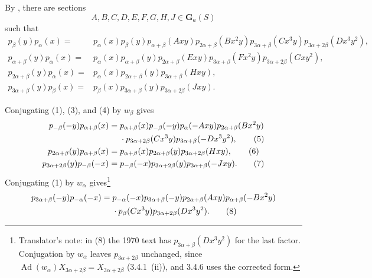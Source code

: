 By , there are sections
\[
  A,B,C,D,E,F,G,H,J\in\mathbf G_a(S)
\]
such that
\begin{align}
 p_\beta(y)p_\alpha(x)
  ={}&p_\alpha(x)p_\beta(y)p_{\alpha+\beta}(Axy)
     p_{2\alpha+\beta}(Bx^2y)p_{3\alpha+\beta}(Cx^3y)
     p_{3\alpha+2\beta}(Dx^3y^2), \tag{1}\label{sga3:XXIII:3.4:eq1}\\
 p_{\alpha+\beta}(y)p_\alpha(x)
  ={}&p_\alpha(x)p_{\alpha+\beta}(y)p_{2\alpha+\beta}(Exy)
     p_{3\alpha+\beta}(Fx^2y)p_{3\alpha+2\beta}(Gxy^2),
     \tag{2}\label{sga3:XXIII:3.4:eq2}\\
 p_{2\alpha+\beta}(y)p_\alpha(x)
  ={}&p_\alpha(x)p_{2\alpha+\beta}(y)p_{3\alpha+\beta}(Hxy),
     \tag{3}\label{sga3:XXIII:3.4:eq3}\\
 p_{3\alpha+\beta}(y)p_\beta(x)
  ={}&p_\beta(x)p_{3\alpha+\beta}(y)p_{3\alpha+2\beta}(Jxy).
     \tag{4}\label{sga3:XXIII:3.4:eq4}
\end{align}

Conjugating (1), (3), and (4) by \(w_\beta\) gives
\begin{align}
 p_{-\beta}(-y)p_{\alpha+\beta}(x)
  ={}&p_{\alpha+\beta}(x)p_{-\beta}(-y)p_\alpha(-Axy)
     p_{2\alpha+\beta}(Bx^2y)\notag\\
    &{}\cdot p_{3\alpha+2\beta}(Cx^3y)
     p_{3\alpha+\beta}(-Dx^3y^2), \tag{5}\label{sga3:XXIII:3.4:eq5}\\
 p_{2\alpha+\beta}(y)p_{\alpha+\beta}(x)
  ={}&p_{\alpha+\beta}(x)p_{2\alpha+\beta}(y)
     p_{3\alpha+2\beta}(Hxy), \tag{6}\label{sga3:XXIII:3.4:eq6}\\
 p_{3\alpha+2\beta}(y)p_{-\beta}(-x)
  ={}&p_{-\beta}(-x)p_{3\alpha+2\beta}(y)
     p_{3\alpha+\beta}(-Jxy). \tag{7}\label{sga3:XXIII:3.4:eq7}
\end{align}
Conjugating (1) by \(w_\alpha\) gives\footnote{Translator's note: in (8) the 1970 text has
\(p_{3\alpha+\beta}(Dx^3y^2)\) for the last factor. Conjugation by \(w_\alpha\) leaves
\(p_{3\alpha+2\beta}\) unchanged, since
\(\operatorname{Ad}(w_\alpha)X_{3\alpha+2\beta}=X_{3\alpha+2\beta}\) (3.4.1~(ii)), and 3.4.6
uses the corrected form.}
\begin{align}
 p_{3\alpha+\beta}(-y)p_{-\alpha}(-x)
  ={}&p_{-\alpha}(-x)p_{3\alpha+\beta}(-y)
     p_{2\alpha+\beta}(Axy)p_{\alpha+\beta}(-Bx^2y)\notag\\
    &{}\cdot p_\beta(Cx^3y)p_{3\alpha+2\beta}(Dx^3y^2).
     \tag{8}\label{sga3:XXIII:3.4:eq8}
\end{align}

